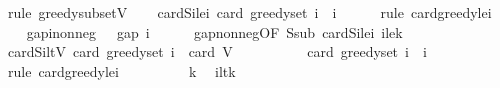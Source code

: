 \begin{isabellebody}
\ {\isacharparenleft}{\kern0pt}rule\ greedy{\isacharunderscore}{\kern0pt}subset{\isacharunderscore}{\kern0pt}V{\isacharparenright}{\kern0pt}\isanewline
\ \ \isamarkupfalse%
\ cardSi{\isacharunderscore}{\kern0pt}le{\isacharunderscore}{\kern0pt}i{\isacharcolon}{\kern0pt}\ {\isachardoublequoteopen}card\ {\isacharparenleft}{\kern0pt}greedy{\isacharunderscore}{\kern0pt}set\ i{\isacharparenright}{\kern0pt}\ {\isasymle}\ i{\isachardoublequoteclose}\isanewline
\ \ \ \ \isamarkupfalse%
\ {\isacharparenleft}{\kern0pt}rule\ card{\isacharunderscore}{\kern0pt}greedy{\isacharunderscore}{\kern0pt}le{\isacharunderscore}{\kern0pt}i{\isacharparenright}{\kern0pt}\isanewline
\isanewline
\ \ \isamarkupfalse%
\ gap{\isacharunderscore}{\kern0pt}i{\isacharunderscore}{\kern0pt}nonneg{\isacharcolon}{\kern0pt}\ {\isachardoublequoteopen}{}\ {\isasymle}\ gap\ i{\isachardoublequoteclose}\isanewline
\ \ \ \ \isamarkupfalse%
\ gap{\isacharunderscore}{\kern0pt}nonneg{\isacharbrackleft}{\kern0pt}OF\ S{\isacharunderscore}{\kern0pt}sub\ cardSi{\isacharunderscore}{\kern0pt}le{\isacharunderscore}{\kern0pt}i\ i{\isacharunderscore}{\kern0pt}le{\isacharunderscore}{\kern0pt}k{\isacharbrackright}{\kern0pt}\ \isakeywordONE{{\isachardot}{\kern0pt}}\isamarkupfalse%
\isanewline
\isanewline
\ \ \isamarkupfalse%
\ cardSi{\isacharunderscore}{\kern0pt}lt{\isacharunderscore}{\kern0pt}V{\isacharcolon}{\kern0pt}\ {\isachardoublequoteopen}card\ {\isacharparenleft}{\kern0pt}greedy{\isacharunderscore}{\kern0pt}set\ i{\isacharparenright}{\kern0pt}\ {\isacharless}{\kern0pt}\ card\ V{\isachardoublequoteclose}\isanewline
\ \ \isamarkupfalse%
\ {\isacharminus}{\kern0pt}\isanewline
\ \ \ \ \isamarkupfalse%
\ {\isachardoublequoteopen}card\ {\isacharparenleft}{\kern0pt}greedy{\isacharunderscore}{\kern0pt}set\ i{\isacharparenright}{\kern0pt}\ {\isasymle}\ i{\isachardoublequoteclose}\isanewline
\ \ \ \ \ \ \isamarkupfalse%
\ {\isacharparenleft}{\kern0pt}rule\ card{\isacharunderscore}{\kern0pt}greedy{\isacharunderscore}{\kern0pt}le{\isacharunderscore}{\kern0pt}i{\isacharparenright}{\kern0pt}\isanewline
\ \ \ \ \isamarkupfalse%
\ \isamarkupfalse%
\ {\isachardoublequoteopen}{\isachardot}{\kern0pt}{\isachardot}{\kern0pt}{\isachardot}{\kern0pt}\ {\isacharless}{\kern0pt}\ k{\isachardoublequoteclose}\ \isamarkupfalse%
\ i{\isacharunderscore}{\kern0pt}lt{\isacharunderscore}{\kern0pt}k\ \isamarkupfalse%

\end{isabellebody}
